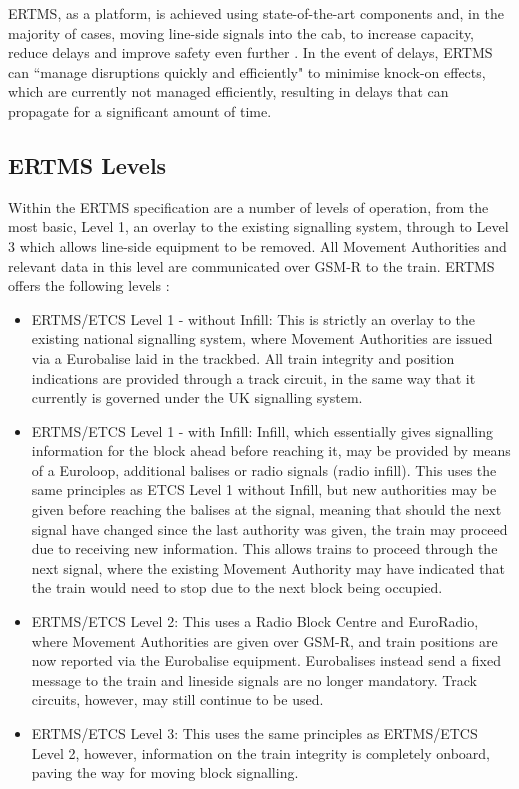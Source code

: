 \documentclass[twoside,11pt,a4paper]{article}
\begin{document}
ERTMS, as a platform, is achieved using state-of-the-art components and, in the majority of cases, moving line-side signals into the cab, to increase capacity, reduce delays and improve safety even further \citep{NetworkRail15d}. In the event of delays, ERTMS can ``manage disruptions quickly and efficiently" \citep[pp. 12]{DfT15a} to minimise knock-on effects, which are currently not managed efficiently, resulting in delays that can propagate for a significant amount of time.
\subsection{ERTMS Levels}
Within the ERTMS specification are a number of levels of operation, from the most basic, Level 1, an overlay to the existing signalling system, through to Level 3 which allows line-side equipment to be removed. All Movement Authorities and relevant data in this level are communicated over GSM-R to the train.
ERTMS offers the following levels \citep{UNIFE14a}:
\begin{itemize}[nolistsep]
\item ERTMS/ETCS Level 1 - without Infill: This is strictly an overlay to the existing national signalling system, where Movement Authorities are issued via a Eurobalise laid in the trackbed. All train integrity and position indications are provided through a track circuit, in the same way that it currently is governed under the UK signalling system.
\item ERTMS/ETCS Level 1 - with Infill: Infill, which essentially gives signalling information for the block ahead before reaching it, may be provided by means of a Euroloop, additional balises or radio signals (radio infill). This uses the same principles as ETCS Level 1 without Infill, but new authorities may be given before reaching the balises at the signal, meaning that should the next signal have changed since the last authority was given, the train may proceed due to receiving new information. This allows trains to proceed through the next signal, where the existing Movement Authority may have indicated that the train would need to stop due to the next block being occupied.
\item ERTMS/ETCS Level 2: This uses a Radio Block Centre and EuroRadio, where Movement Authorities are given over GSM-R, and train positions are now reported via the Eurobalise equipment. Eurobalises instead send a fixed message to the train and lineside signals are no longer mandatory. Track circuits, however, may still continue to be used.
\item ERTMS/ETCS Level 3: This uses the same principles as ERTMS/ETCS Level 2, however, information on the train integrity is completely onboard, paving the way for moving block signalling.
\end{itemize}
\end{document}
